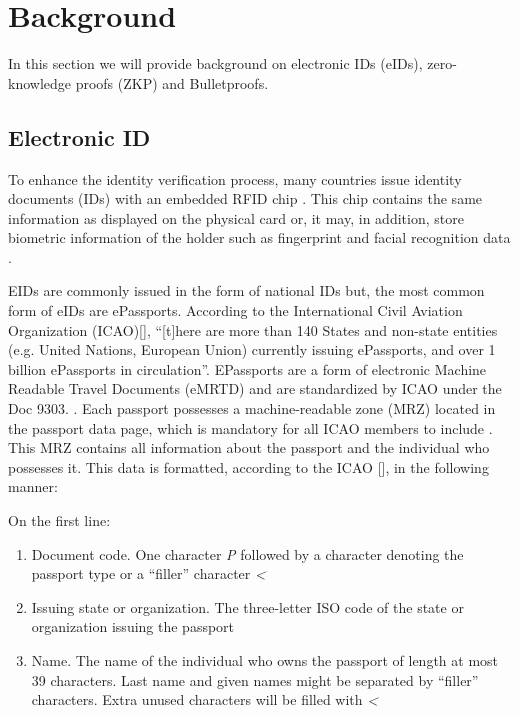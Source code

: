 \documentclass[sigconf,screen,nonacm]{acmart}
\begin{document}
  \section{Background}

  In this section we will provide background on electronic IDs (eIDs), zero-knowledge
  proofs (ZKP) and Bulletproofs.

  \subsection{Electronic ID}

  To enhance the identity verification process, many countries issue identity documents
  (IDs) with an embedded RFID chip \cite{wiki1}. This chip contains the same
  information as displayed on the physical card or, it may, in addition, store
  biometric information of the holder such as fingerprint and facial recognition
  data \cite{wiki1}.

  EIDs are commonly issued in the form of national IDs but, the most common form of
  eIDs are ePassports. According to the International Civil Aviation Organization
  (ICAO)[\citeyear{ICAO1}], ``[t]here are more than 140 States and non-state entities
  (e.g. United Nations, European Union) currently issuing ePassports, and over 1
  billion ePassports in circulation''. EPassports are a form of electronic Machine
  Readable Travel Documents (eMRTD) and are standardized by ICAO under the Doc 9303.
  \cite{ICAO2, wiki2}. Each passport possesses a machine-readable zone (MRZ) located
  in the passport data page, which is mandatory for all ICAO members to include
  \cite{ICAO2}. This MRZ contains all information about the passport and the
  individual who possesses it. This data is formatted, according to the ICAO
  [\citeyear{ICAO2}], in the following manner:

  On the first line:
  \begin{enumerate}
    \item Document code. One character \emph{P} followed by a character denoting the
      passport type or a ``filler'' character \emph{<}
    \item Issuing state or organization. The three-letter ISO code of the state or
      organization issuing the passport
    \item Name. The name of the individual who owns the passport of length at most 39
      characters. Last name and given names might be separated by ``filler''
      characters. Extra unused characters will be filled with \emph{<}
  \end{enumerate}
\end{document}
